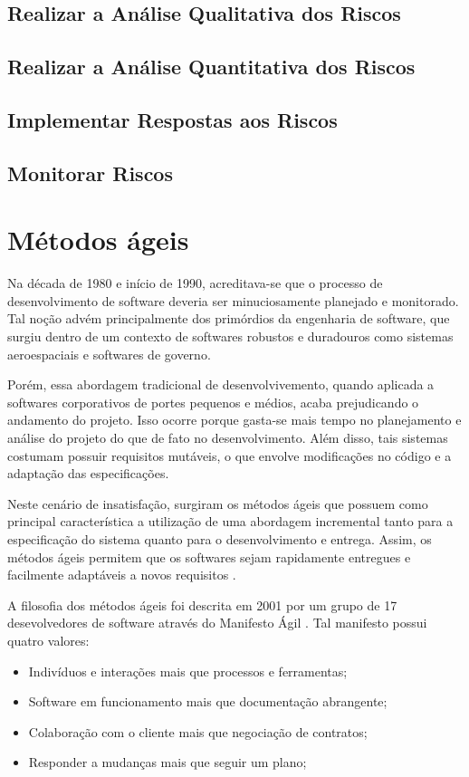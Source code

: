 \documentclass[
    12pt,       %
    openright,      %
    twoside,      %
    a4paper,      %
    english,      %
    french,       %
    spanish,      %
    brazil,       %
    ]{abntex2}
\begin{document}
\subsection{Realizar a Análise Qualitativa dos Riscos}
\subsection{Realizar a Análise Quantitativa dos Riscos}
\subsection{Implementar Respostas aos Riscos}
\subsection{Monitorar Riscos}

\section{Métodos ágeis}

Na década de 1980 e início de 1990, acreditava-se que o processo de desenvolvimento de software deveria ser minuciosamente planejado e monitorado. Tal noção advém principalmente dos primórdios da engenharia de software, que surgiu dentro de um contexto de softwares robustos e duradouros como sistemas aeroespaciais e softwares de governo. 

Porém, essa abordagem tradicional de desenvolvivemento, quando aplicada a softwares corporativos de portes pequenos e médios, acaba prejudicando o andamento do projeto. Isso ocorre porque gasta-se mais tempo no planejamento e análise do projeto do que de fato no desenvolvimento. Além disso, tais sistemas costumam possuir requisitos mutáveis, o que envolve modificações no código e a adaptação das especificações. 

Neste cenário de insatisfação, surgiram os métodos ágeis que possuem como principal característica a utilização de uma abordagem incremental tanto para a especificação do sistema quanto para o desenvolvimento e entrega. Assim, os métodos ágeis permitem que os softwares sejam rapidamente entregues e facilmente adaptáveis a novos requisitos \cite{SOMMERVILLE:2011}.

A filosofia dos métodos ágeis foi descrita em 2001 por um grupo de 17 desevolvedores de software através do Manifesto Ágil \cite{AGILEMANIFEST:2001}. Tal manifesto possui quatro valores:

\begin{itemize}
        \item Indivíduos e interações mais que processos e ferramentas;
        \item Software em funcionamento mais que documentação abrangente;
        \item Colaboração com o cliente mais que negociação de contratos;
        \item Responder a mudanças mais que seguir um plano;
\end{itemize}
\end{document}
